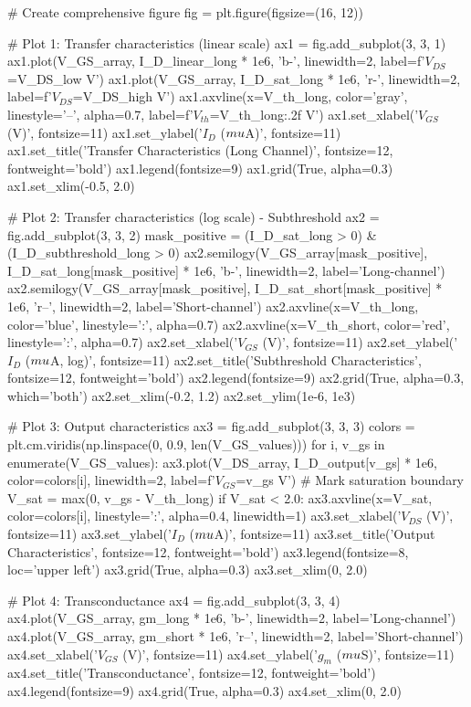 \documentclass[a4paper, 11pt]{article}
\begin{document}
\begin{pycode}
# Create comprehensive figure
fig = plt.figure(figsize=(16, 12))

# Plot 1: Transfer characteristics (linear scale)
ax1 = fig.add_subplot(3, 3, 1)
ax1.plot(V_GS_array, I_D_linear_long * 1e6, 'b-', linewidth=2, label=f'$V_{{DS}}$={V_DS_low} V')
ax1.plot(V_GS_array, I_D_sat_long * 1e6, 'r-', linewidth=2, label=f'$V_{{DS}}$={V_DS_high} V')
ax1.axvline(x=V_th_long, color='gray', linestyle='--', alpha=0.7, label=f'$V_{{th}}$={V_th_long:.2f} V')
ax1.set_xlabel('$V_{GS}$ (V)', fontsize=11)
ax1.set_ylabel('$I_D$ ($\\mu$A)', fontsize=11)
ax1.set_title('Transfer Characteristics (Long Channel)', fontsize=12, fontweight='bold')
ax1.legend(fontsize=9)
ax1.grid(True, alpha=0.3)
ax1.set_xlim(-0.5, 2.0)

# Plot 2: Transfer characteristics (log scale) - Subthreshold
ax2 = fig.add_subplot(3, 3, 2)
mask_positive = (I_D_sat_long > 0) & (I_D_subthreshold_long > 0)
ax2.semilogy(V_GS_array[mask_positive], I_D_sat_long[mask_positive] * 1e6, 'b-', linewidth=2, label='Long-channel')
ax2.semilogy(V_GS_array[mask_positive], I_D_sat_short[mask_positive] * 1e6, 'r--', linewidth=2, label='Short-channel')
ax2.axvline(x=V_th_long, color='blue', linestyle=':', alpha=0.7)
ax2.axvline(x=V_th_short, color='red', linestyle=':', alpha=0.7)
ax2.set_xlabel('$V_{GS}$ (V)', fontsize=11)
ax2.set_ylabel('$I_D$ ($\\mu$A, log)', fontsize=11)
ax2.set_title('Subthreshold Characteristics', fontsize=12, fontweight='bold')
ax2.legend(fontsize=9)
ax2.grid(True, alpha=0.3, which='both')
ax2.set_xlim(-0.2, 1.2)
ax2.set_ylim(1e-6, 1e3)

# Plot 3: Output characteristics
ax3 = fig.add_subplot(3, 3, 3)
colors = plt.cm.viridis(np.linspace(0, 0.9, len(V_GS_values)))
for i, v_gs in enumerate(V_GS_values):
    ax3.plot(V_DS_array, I_D_output[v_gs] * 1e6, color=colors[i], linewidth=2,
             label=f'$V_{{GS}}$={v_gs} V')
    # Mark saturation boundary
    V_sat = max(0, v_gs - V_th_long)
    if V_sat < 2.0:
        ax3.axvline(x=V_sat, color=colors[i], linestyle=':', alpha=0.4, linewidth=1)
ax3.set_xlabel('$V_{DS}$ (V)', fontsize=11)
ax3.set_ylabel('$I_D$ ($\\mu$A)', fontsize=11)
ax3.set_title('Output Characteristics', fontsize=12, fontweight='bold')
ax3.legend(fontsize=8, loc='upper left')
ax3.grid(True, alpha=0.3)
ax3.set_xlim(0, 2.0)

# Plot 4: Transconductance
ax4 = fig.add_subplot(3, 3, 4)
ax4.plot(V_GS_array, gm_long * 1e6, 'b-', linewidth=2, label='Long-channel')
ax4.plot(V_GS_array, gm_short * 1e6, 'r--', linewidth=2, label='Short-channel')
ax4.set_xlabel('$V_{GS}$ (V)', fontsize=11)
ax4.set_ylabel('$g_m$ ($\\mu$S)', fontsize=11)
ax4.set_title('Transconductance', fontsize=12, fontweight='bold')
ax4.legend(fontsize=9)
ax4.grid(True, alpha=0.3)
ax4.set_xlim(0, 2.0)


\end{pycode}
\end{document}

